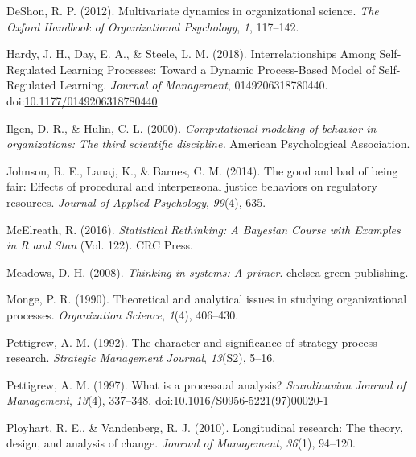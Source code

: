 \documentclass[english,,man]{apa6}
\theoremstyle{definition}
\theoremstyle{definition}
\theoremstyle{definition}
\theoremstyle{remark}
\begin{document}
\leavevmode\hypertarget{ref-deshon_multivariate_2012}{}%
DeShon, R. P. (2012). Multivariate dynamics in organizational science.
\emph{The Oxford Handbook of Organizational Psychology}, \emph{1},
117--142.

\leavevmode\hypertarget{ref-hardy_interrelationships_2018}{}%
Hardy, J. H., Day, E. A., \& Steele, L. M. (2018). Interrelationships
Among Self-Regulated Learning Processes: Toward a Dynamic Process-Based
Model of Self-Regulated Learning. \emph{Journal of Management},
0149206318780440.
doi:\href{https://doi.org/10.1177/0149206318780440}{10.1177/0149206318780440}

\leavevmode\hypertarget{ref-ilgen_computational_2000}{}%
Ilgen, D. R., \& Hulin, C. L. (2000). \emph{Computational modeling of
behavior in organizations: The third scientific discipline.} American
Psychological Association.

\leavevmode\hypertarget{ref-johnson_good_2014}{}%
Johnson, R. E., Lanaj, K., \& Barnes, C. M. (2014). The good and bad of
being fair: Effects of procedural and interpersonal justice behaviors on
regulatory resources. \emph{Journal of Applied Psychology},
\emph{99}(4), 635.

\leavevmode\hypertarget{ref-mcelreath_statistical_2016}{}%
McElreath, R. (2016). \emph{Statistical Rethinking: A Bayesian Course
with Examples in R and Stan} (Vol. 122). CRC Press.

\leavevmode\hypertarget{ref-meadows2008thinking}{}%
Meadows, D. H. (2008). \emph{Thinking in systems: A primer}. chelsea
green publishing.

\leavevmode\hypertarget{ref-monge_theoretical_1990}{}%
Monge, P. R. (1990). Theoretical and analytical issues in studying
organizational processes. \emph{Organization Science}, \emph{1}(4),
406--430.

\leavevmode\hypertarget{ref-pettigrew_character_1992}{}%
Pettigrew, A. M. (1992). The character and significance of strategy
process research. \emph{Strategic Management Journal}, \emph{13}(S2),
5--16.

\leavevmode\hypertarget{ref-pettigrew_what_1997-1}{}%
Pettigrew, A. M. (1997). What is a processual analysis?
\emph{Scandinavian Journal of Management}, \emph{13}(4), 337--348.
doi:\href{https://doi.org/10.1016/S0956-5221(97)00020-1}{10.1016/S0956-5221(97)00020-1}

\leavevmode\hypertarget{ref-ployhart_longitudinal_2010}{}%
Ployhart, R. E., \& Vandenberg, R. J. (2010). Longitudinal research: The
theory, design, and analysis of change. \emph{Journal of Management},
\emph{36}(1), 94--120.
\end{document}
